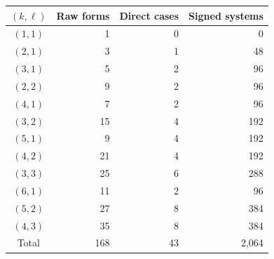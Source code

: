 \begin{center}
\small\setlength{\tabcolsep}{8pt}\renewcommand{\arraystretch}{1.15}
\begin{tabular}{crrr}
\toprule
$(k,\ell)$ & Raw forms & Direct cases & Signed systems\\
\midrule
$(1,1)$ & 1 & 0 & 0\\
$(2,1)$ & 3 & 1 & 48\\
$(3,1)$ & 5 & 2 & 96\\
$(2,2)$ & 9 & 2 & 96\\
$(4,1)$ & 7 & 2 & 96\\
$(3,2)$ & 15 & 4 & 192\\
$(5,1)$ & 9 & 4 & 192\\
$(4,2)$ & 21 & 4 & 192\\
$(3,3)$ & 25 & 6 & 288\\
$(6,1)$ & 11 & 2 & 96\\
$(5,2)$ & 27 & 8 & 384\\
$(4,3)$ & 35 & 8 & 384\\
\midrule
Total & 168 & 43 & 2,064\\
\bottomrule
\end{tabular}
\end{center}
